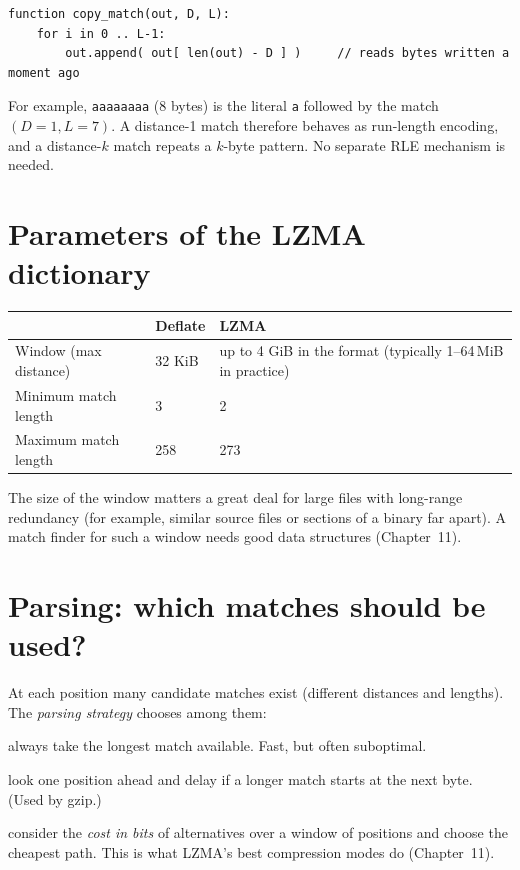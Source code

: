 \documentclass[11pt,a4paper,oneside]{book}
\begin{document}
\begin{lstlisting}[language=pseudo]
function copy_match(out, D, L):
    for i in 0 .. L-1:
        out.append( out[ len(out) - D ] )     // reads bytes written a moment ago
\end{lstlisting}

For example, \texttt{aaaaaaaa} (8 bytes) is the literal \texttt{a} followed by the match $(D{=}1,L{=}7)$. A distance-1 match
therefore behaves as run-length encoding, and a distance-$k$ match repeats a $k$-byte pattern. No separate RLE mechanism is
needed.

\section{Parameters of the LZMA dictionary}

\begin{center}
\begin{tabular}{lp{2.4cm}p{8cm}}
\toprule
 & Deflate & LZMA\\
\midrule
Window (max distance) & 32 KiB & up to 4 GiB in the format (typically 1--64\,MiB in practice)\\
Minimum match length & 3 & 2\\
Maximum match length & 258 & 273\\
\bottomrule
\end{tabular}
\end{center}

The size of the window matters a great deal for large files with long-range redundancy (for example, similar source files or
sections of a binary far apart). A match finder for such a window needs good data structures (Chapter~11).

\section{Parsing: which matches should be used?}

At each position many candidate matches exist (different distances and lengths). The \emph{parsing strategy} chooses among them:

\begin{description}[leftmargin=2em]
\item[Greedy] always take the longest match available. Fast, but often suboptimal.
\item[Lazy] look one position ahead and delay if a longer match starts at the next byte. (Used by gzip.)
\item[Optimal] consider the \emph{cost in bits} of alternatives over a window of positions and choose the cheapest path.
  This is what LZMA's best compression modes do (Chapter~11).
\end{description}
\end{document}
